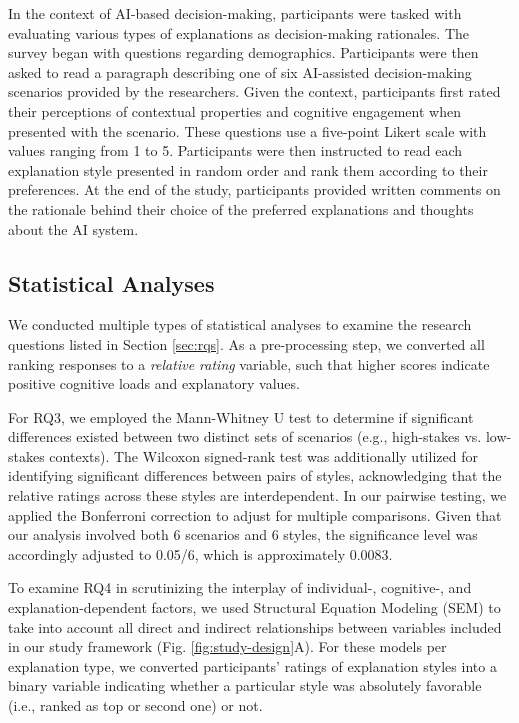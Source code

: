 In the context of AI-based decision-making, participants were tasked with evaluating various types of explanations as decision-making rationales. The survey began with questions regarding demographics. Participants were then asked to read a paragraph describing one of six AI-assisted decision-making scenarios provided by the researchers. Given the context, participants first rated their perceptions of contextual properties and cognitive engagement when presented with the scenario. These questions use a five-point  Likert scale with values ranging from 1 to 5. Participants were then instructed to read each explanation style presented in random order and rank them according to their preferences. At the end of the study, participants provided written comments on the rationale behind their choice of the preferred explanations and thoughts about the AI system.

\subsection{Statistical Analyses}
\label{sec:stat}

We conducted multiple types of statistical analyses to examine the research questions listed in Section \ref{sec:rqs}. As a pre-processing step, we converted all ranking responses to a {\it relative rating} variable, such that higher scores indicate positive cognitive loads and explanatory values. 

For RQ3, we employed the Mann-Whitney U test to determine if significant differences existed between two distinct sets of scenarios (e.g., high-stakes vs. low-stakes contexts). The Wilcoxon signed-rank test was additionally utilized for identifying significant differences between pairs of styles, acknowledging that the relative ratings across these styles are interdependent. In our pairwise testing, we applied the Bonferroni correction to adjust for multiple comparisons. Given that our analysis involved both 6 scenarios and 6 styles, the significance level was accordingly adjusted to 0.05/6, which is approximately 0.0083.

To examine RQ4 in scrutinizing the interplay of individual-, cognitive-, and explanation-dependent factors, we used Structural Equation Modeling (SEM) to take into account all direct and indirect relationships between variables included in our study framework (Fig. \ref{fig:study-design}A). For these models per explanation type, we converted participants' ratings of explanation styles into a binary variable indicating whether a particular style was absolutely favorable (i.e., ranked as top or second one) or not.


